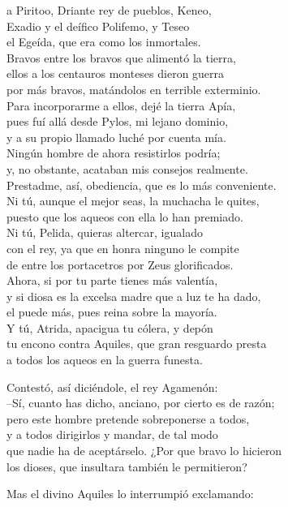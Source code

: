 \documentclass[11pt,twoside]{article}
\begin{document}
a Piritoo, Driante rey de pueblos, Keneo,\\
Exadio y el deífico Polifemo, y Teseo\\
el Egeída, que era como los inmortales.\\
Bravos entre los bravos que alimentó la tierra,\\
ellos a los centauros monteses dieron guerra\\
por más bravos, matándolos en terrible exterminio.\\
Para incorporarme a ellos, dejé la tierra Apía,\\
pues fuí allá desde Pylos, mi lejano dominio,\\
y a su propio llamado luché por cuenta mía.\\
Ningún hombre de ahora resistirlos podría;\\
y, no obstante, acataban mis consejos realmente.\\
Prestadme, así, obediencia, que es lo más conveniente.\\
Ni tú, aunque el mejor seas, la muchacha le quites,\\
puesto que los aqueos con ella lo han premiado.\\
Ni tú, Pelida, quieras altercar, igualado\\
con el rey, ya que en honra ninguno le compite\\
de entre los portacetros por Zeus glorificados.\\
Ahora, si por tu parte tienes más valentía,\\
y si diosa es la excelsa madre que a luz te ha dado,\\
el puede más, pues reina sobre la mayoría.\\
Y tú, Atrida, apacigua tu cólera, y depón\\
tu encono contra Aquiles, que gran resguardo presta\\
a todos los aqueos en la guerra funesta.\par
Contestó, así diciéndole, el rey Agamenón:\\
--Sí, cuanto has dicho, anciano, por cierto es de razón;\\
pero este hombre pretende sobreponerse a todos,\\
y a todos dirigirlos y mandar, de tal modo\\
que nadie ha de aceptárselo. ¿Por que bravo lo hicieron\\
los dioses, que insultara también le permitieron?\par
Mas el divino Aquiles lo interrumpió exclamando:\\
\end{document}
